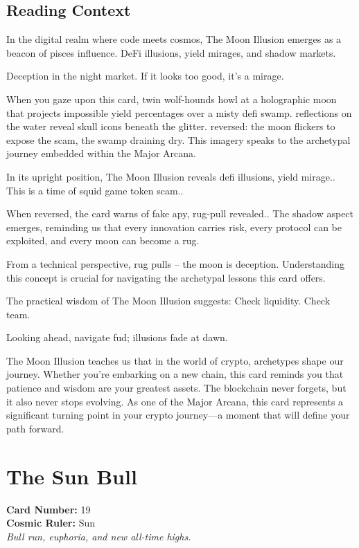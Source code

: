 \documentclass[11pt,oneside]{book}
\begin{document}
\begin{minipage}[t]{0.55\textwidth}
  \subsection*{Reading Context}
  In the digital realm where code meets cosmos, The Moon Illusion emerges as a beacon of pisces influence. DeFi illusions, yield mirages, and shadow markets.

  Deception in the night market. If it looks too good, it's a mirage.

  When you gaze upon this card, twin wolf-hounds howl at a holographic moon that projects impossible yield percentages over a misty defi swamp. reflections on the water reveal skull icons beneath the glitter. reversed: the moon flickers to expose the scam, the swamp draining dry. This imagery speaks to the archetypal journey embedded within the Major Arcana.

  In its upright position, The Moon Illusion reveals defi illusions, yield mirage.. This is a time of squid game token scam..

  When reversed, the card warns of fake apy, rug-pull revealed.. The shadow aspect emerges, reminding us that every innovation carries risk, every protocol can be exploited, and every moon can become a rug.

  From a technical perspective, rug pulls – the moon is deception. Understanding this concept is crucial for navigating the archetypal lessons this card offers.

  The practical wisdom of The Moon Illusion suggests: Check liquidity. Check team.

  Looking ahead, navigate fud; illusions fade at dawn.

  The Moon Illusion teaches us that in the world of crypto, archetypes shape our journey. Whether you're embarking on a new chain, this card reminds you that patience and wisdom are your greatest assets. The blockchain never forgets, but it also never stops evolving. As one of the Major Arcana, this card represents a significant turning point in your crypto journey—a moment that will define your path forward.

\end{minipage}

\newpage
\section*{The Sun Bull}

\begin{minipage}[t]{0.55\textwidth}
  \vspace{0pt}
  \textbf{Card Number:} 19\\  \textbf{Cosmic Ruler:} Sun\\  \textit{Bull run, euphoria, and new all-time highs.}
\end{minipage}
\end{document}
